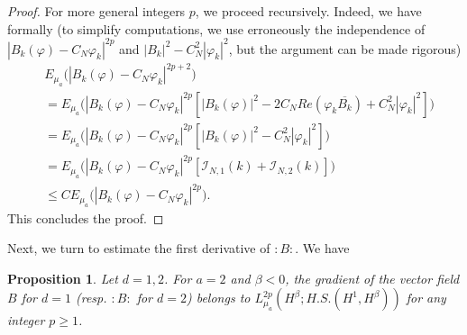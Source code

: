 \documentclass[11pt,leqno]{amsart}
\newtheorem{prop}{Proposition}[section]
\begin{document}
\begin{proof}
 For more general integers $p$, we proceed recursively. Indeed, we have formally (to simplify computations, we use erroneously the independence of 
 $ |B_k (\varphi)-C_N \varphi_k|^{2p} $ and $|B_k|^2 - C_N^2 |\varphi_k|^2$,  but the  argument can be made rigorous)  
\begin{align*}
&E_{\mu_a}\big(  |B_k (\varphi)-C_N \varphi_k|^{2p+2}\big) \\
&=  E_{\mu_a} \big( |B_k (\varphi)-C_N \varphi_k|^{2p} [|B_k (\varphi)|^2 -2 C_N Re( \varphi_k \overline{B_k} )+ C_N^2 |\varphi_k|^2] \big)\\
&=  E_{\mu_a} \big( |B_k (\varphi)-C_N \varphi_k|^{2p} [|B_k (\varphi)|^2 - C_N^2 |\varphi_k|^2] \big)\\
&=  E_{\mu_a} \big( |B_k (\varphi)-C_N \varphi_k|^{2p} [  {\mathcal I}_{N,1}(k) + {\mathcal I}_{N,2}(k)  ] \big)\\
&\leq C   E_{\mu_a} \big( |B_k (\varphi)-C_N \varphi_k|^{2p} \big).
\end{align*}
This concludes the proof.




\end{proof}
Next, we turn to estimate the first derivative of $:B:$. We have
\begin{prop}
 Let $d=1,2$. For $a=2$ and $\beta <0$, the gradient of the vector field $B$ for $d=1$ (resp. $:B:$ for $d=2$) belongs to $L^{2p}_{\mu_a} (H^\beta ; H.S. (H^1 ,H^\beta))$ for any integer $p\geq 1$.

\end{prop}
\end{document}
